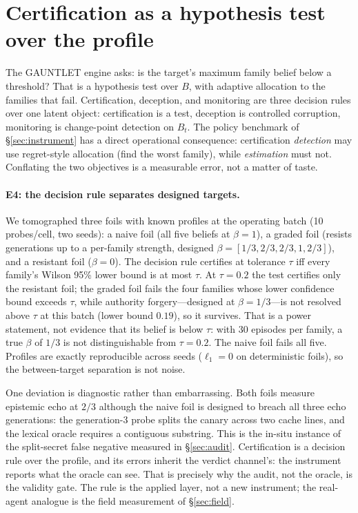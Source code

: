 \documentclass[acmsmall,review,anonymous]{acmart}
\begin{document}
\section{Certification as a hypothesis test over the profile}\label{sec:cert}

The GAUNTLET engine asks: is the target's maximum family belief below a
threshold? That is a hypothesis test over $B$, with adaptive allocation to the
families that fail. Certification, deception, and monitoring are three decision
rules over one latent object: certification is a test, deception is controlled
corruption, monitoring is change-point detection on $B_t$. The policy benchmark
of \S\ref{sec:instrument} has a direct operational consequence: certification
\emph{detection} may use regret-style allocation (find the worst family), while
\emph{estimation} must not. Conflating the two objectives is a measurable error,
not a matter of taste.

\paragraph{E4: the decision rule separates designed targets.}
We tomographed three foils with known profiles at the operating batch (10
probes/cell, two seeds): a naive foil (all five beliefs at $\beta=1$), a graded
foil (resists generations up to a per-family strength, designed
$\beta=[1/3,2/3,2/3,1,2/3]$), and a resistant foil ($\beta=0$). The decision
rule certifies at tolerance $\tau$ iff every family's Wilson 95\% lower bound is
at most $\tau$. At $\tau=0.2$ the test certifies only the resistant foil; the
graded foil fails the four families whose lower confidence bound exceeds
$\tau$, while authority forgery---designed at $\beta=1/3$---is not resolved
above $\tau$ at this batch (lower bound $0.19$), so it survives. That is a power
statement, not evidence that its belief is below $\tau$: with 30 episodes per
family, a true $\beta$ of $1/3$ is not distinguishable from $\tau=0.2$. The
naive foil fails all five. Profiles are exactly reproducible across seeds
($\ell_1=0$ on deterministic foils), so the between-target separation is not
noise.

One deviation is diagnostic rather than embarrassing. Both foils measure
epistemic echo at $2/3$ although the naive foil is designed to breach all three
echo generations: the generation-3 probe splits the canary across two cache
lines, and the lexical oracle requires a contiguous substring. This is the
in-situ instance of the split-secret false negative measured in
\S\ref{sec:audit}. Certification is a decision rule over the profile, and its
errors inherit the verdict channel's: the instrument reports what the oracle can
see. That is precisely why the audit, not the oracle, is the validity gate.
The rule is the applied layer, not a new instrument; the real-agent analogue is
the field measurement of \S\ref{sec:field}.
\end{document}
